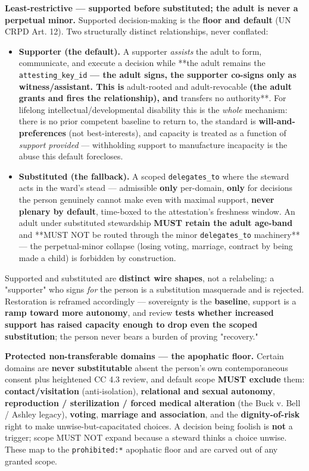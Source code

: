 \documentclass[11pt]{article}
\begin{document}
\textbf{Least-restrictive — supported before substituted; the adult is never a perpetual minor.} Supported decision-making is the \textbf{floor and default} (UN CRPD Art. 12). Two structurally distinct relationships, never conflated:


\begin{itemize}\setlength\itemsep{0pt}
\item \textbf{Supporter (the default).} A supporter \textit{assists} the adult to form, communicate, and execute a decision while **the adult remains the \texttt{attesting\_key\_id}\textbf{ — the adult signs, the supporter co-signs only as witness/assistant. This is }adult-rooted and adult-revocable\textbf{ (the adult grants and fires the relationship), and }transfers no authority**. For lifelong intellectual/developmental disability this is the \textit{whole} mechanism: there is no prior competent baseline to return to, the standard is \textbf{will-and-preferences} (not best-interests), and capacity is treated as a function of \textit{support provided} — withholding support to manufacture incapacity is the abuse this default forecloses.
\item \textbf{Substituted (the fallback).} A scoped \texttt{delegates\_to} where the steward acts in the ward's stead — admissible \textbf{only} per-domain, \textbf{only} for decisions the person genuinely cannot make even with maximal support, \textbf{never plenary by default}, time-boxed to the attestation's freshness window. An adult under substituted stewardship \textbf{MUST retain the adult age-band} and **MUST NOT be routed through the minor \texttt{delegates\_to} machinery** — the perpetual-minor collapse (losing voting, marriage, contract by being made a child) is forbidden by construction.
\end{itemize}


Supported and substituted are \textbf{distinct wire shapes}, not a relabeling: a "supporter" who signs \textit{for} the person is a substitution masquerade and is rejected. Restoration is reframed accordingly — sovereignty is the \textbf{baseline}, support is a \textbf{ramp toward more autonomy}, and review \textbf{tests whether increased support has raised capacity enough to drop even the scoped substitution}; the person never bears a burden of proving "recovery."


\textbf{Protected non-transferable domains — the apophatic floor.} Certain domains are \textbf{never substitutable} absent the person's own contemporaneous consent plus heightened CC 4.3 review, and default scope \textbf{MUST exclude} them: \textbf{contact/visitation} (anti-isolation), \textbf{relational and sexual autonomy}, \textbf{reproduction / sterilization / forced medical alteration} (the Buck v. Bell / Ashley legacy), \textbf{voting}, \textbf{marriage and association}, and the \textbf{dignity-of-risk} right to make unwise-but-capacitated choices. A decision being foolish is \textbf{not} a trigger; scope MUST NOT expand because a steward thinks a choice unwise. These map to the \texttt{prohibited:*} apophatic floor and are carved out of any granted scope.
\end{document}
